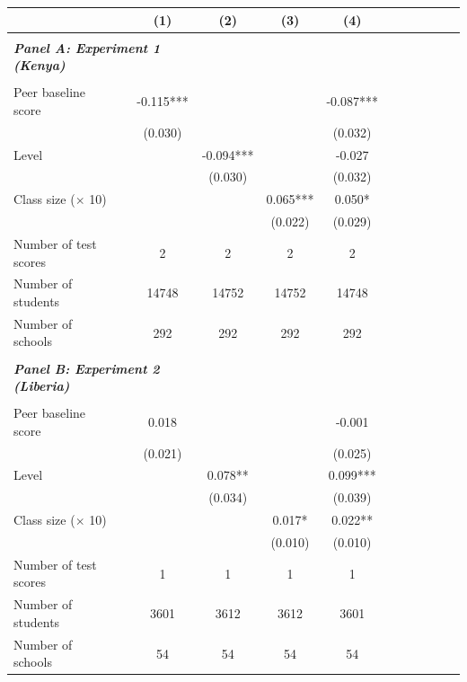 \begin{center} 
\caption{\small Effect on absolute deviation from the classroom mean outcome} 
\label{tab:descriptives} 
\begin{footnotesize}
\begin{threeparttable}
\begin{tabular} {@{} l l c c c c c c c c c c  @{}} \toprule \toprule
& &(1)&(2)&(3)&(4) \\ \midrule 
\\
\multicolumn{3}{l}{\textbf{\textit{Panel A: Experiment 1 (Kenya)}}} \\
\\
Peer baseline score &  & -0.115*** &  &  & -0.087*** \\
                 &  & (0.030) &  &  & (0.032) \\
Level &  &  & -0.094*** &  & -0.027 \\
                 &  &  & (0.030) &  & (0.032) \\
Class size ($\times$ 10) &  &  &  & 0.065*** & 0.050* \\
                 &  &  &  & (0.022) & (0.029) \\
\midrule
Number of test scores &  & 2 & 2 & 2 & 2 \\
Number of students &  & 14748 & 14752 & 14752 & 14748 \\
Number of schools &  & 292 & 292 & 292 & 292 \\
 \midrule
\\
\multicolumn{3}{l}{\textbf{\textit{Panel B: Experiment 2 (Liberia)}}} \\
\\
Peer baseline score &  & 0.018 &  &  & -0.001 \\
                 &  & (0.021) &  &  & (0.025) \\
Level &  &  & 0.078** &  & 0.099*** \\
                 &  &  & (0.034) &  & (0.039) \\
Class size ($\times$ 10) &  &  &  & 0.017* & 0.022** \\
                 &  &  &  & (0.010) & (0.010) \\
\midrule
Number of test scores &  & 1 & 1 & 1 & 1 \\
Number of students &  & 3601 & 3612 & 3612 & 3601 \\
Number of schools &  & 54 & 54 & 54 & 54 \\
\bottomrule
\end{tabular}
\begin{tablenotes}

\end{tablenotes}
\end{threeparttable}
\end{footnotesize}
\end{center}
